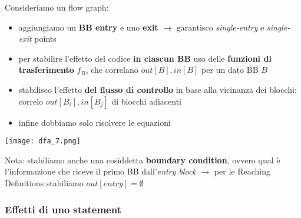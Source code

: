 \noindent\begin{minipage}[c]{.67\textwidth}
Consideriamo un flow graph:
\begin{itemize}
  \item aggiungiamo un \textbf{BB entry} e uno \textbf{exit} $\rightarrow$ garantisco \textit{single-entry} e \textit{single-exit} points
  \item per stabilire l'effetto del codice \textbf{in ciascun BB} uso delle \textbf{funzioni di trasferimento} $f_{B}$, che correlano $out[B], in[B]$ per un dato BB $B$
  \item stabilisco l'effetto \textbf{del flusso di controllo} in base alla vicinanza dei blocchi: correlo $out[B_{i}], in[B_{j}]$ di blocchi adiacenti
  \item infine dobbiamo solo risolvere le equazioni 
\end{itemize}
\end{minipage}
\hfill
\begin{minipage}[c]{.3\textwidth}
\texttt{[image: dfa\_7.png]}
\end{minipage}

\vspace{-1em}
\begin{emphasize}
    Nota: stabiliamo anche una cosiddetta \textbf{boundary condition}, ovvero qual \`e l'informazione che riceve il primo BB dall'\textit{entry block} $\rightarrow$ per le Reaching Definitions stabiliamo $out[entry] = \emptyset$
\end{emphasize}


\subsubsection{Effetti di uno statement}

